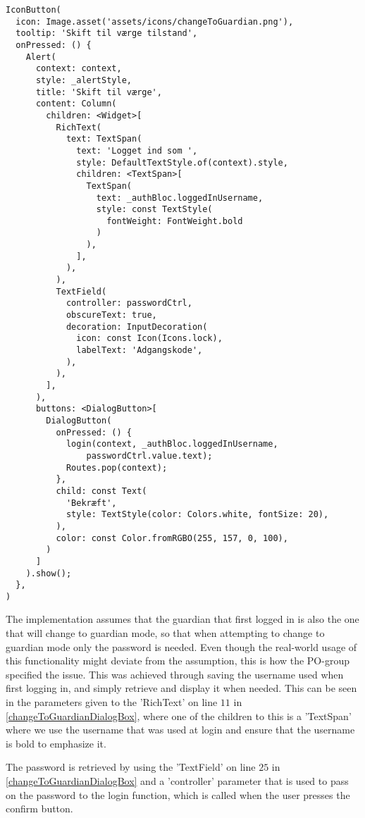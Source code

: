 \begin{lstlisting}[caption={Dialogbox for confirming password},captionpos=b, label=changeToGuardianDialogBox]
IconButton(
  icon: Image.asset('assets/icons/changeToGuardian.png'),
  tooltip: 'Skift til værge tilstand',
  onPressed: () {
    Alert(
      context: context,
      style: _alertStyle,
      title: 'Skift til værge',
      content: Column(
        children: <Widget>[
          RichText(
            text: TextSpan(
              text: 'Logget ind som ',
              style: DefaultTextStyle.of(context).style,
              children: <TextSpan>[
                TextSpan(
                  text: _authBloc.loggedInUsername,
                  style: const TextStyle(
                    fontWeight: FontWeight.bold
                  )
                ),
              ],
            ),
          ),
          TextField(
            controller: passwordCtrl,
            obscureText: true,
            decoration: InputDecoration(
              icon: const Icon(Icons.lock),
              labelText: 'Adgangskode',
            ),
          ),
        ],
      ),
      buttons: <DialogButton>[
        DialogButton(
          onPressed: () {
            login(context, _authBloc.loggedInUsername,
                passwordCtrl.value.text);
            Routes.pop(context);
          },
          child: const Text(
            'Bekræft',
            style: TextStyle(color: Colors.white, fontSize: 20),
          ),
          color: const Color.fromRGBO(255, 157, 0, 100),
        )
      ]
    ).show();
  },
)
\end{lstlisting}

The implementation assumes that the guardian that first logged in is also the one that will change to guardian mode, so that when attempting to change to guardian mode only the password is needed.
Even though the real-world usage of this functionality might deviate from the assumption, this is how the PO-group specified the issue.
This was achieved through saving the username used when first logging in, and simply retrieve and display it when needed.
This can be seen in the parameters given to the 'RichText' on line $11$ in \autoref{changeToGuardianDialogBox}, where one of the children to this is a 'TextSpan' where we use the username that was used at login and ensure that the username is bold to emphasize it.

The password is retrieved by using the 'TextField' on line $25$ in \autoref{changeToGuardianDialogBox} and a 'controller' parameter that is used to pass on the password to the login function, which is called when the user presses the confirm button.

